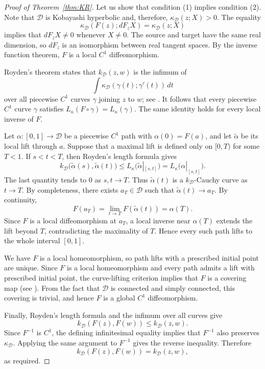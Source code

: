 \documentclass[10pt,a4paper]{amsart}
\newcommand{\D}{\mathcal D}
\newcommand{\kD}{k_{\D}}
\newcommand{\kapD}{\kappa_{\D}}
\begin{document}
\begin{proof}[Proof of Theorem~\ref{thm:KR}]
Let us show that condition {\rm (1)} implies condition
{\rm (2)}. Note that $\D$ is Kobayashi hyperbolic and, therefore,
$\kapD(z;X)>0$. The equality
\[
\kapD(F(z);dF_zX)=\kapD(z;X)
\]
implies that $dF_zX\neq0$ whenever $X\neq0$. The source and target have the same real dimension, so $dF_z$ is an
isomorphism between real tangent spaces. By the inverse
function theorem, $F$ is a local $C^1$ diffeomorphism.

Royden's theorem states that $\kD(z,w)$ is the infimum of
\[
\int \kapD(\gamma(t);\gamma'(t))\,dt
\]
over all piecewise $C^1$ curves $\gamma$ joining $z$ to $w$; see
\cite{Royden,JP}. It follows that every piecewise $C^1$ curve $\gamma$
satisfies $L_\kappa(F\circ\gamma)=L_\kappa(\gamma)$.
The same identity holds for every local inverse of $F$.

Let
$\alpha:[0,1]\to\D$ be a piecewise $C^1$ path with
$\alpha(0)=F(a)$, and let $\widetilde\alpha$ be its local lift through $a$. Suppose that a maximal lift is defined only on $[0,T)$ for some
$T<1$. If $s<t<T$, then Royden's length formula gives
\[
\kD\bigl(\widetilde\alpha(s),\widetilde\alpha(t)\bigr)
\leq
L_\kappa\bigl(\widetilde\alpha|_{[s,t]}\bigr)
=
L_\kappa\bigl(\alpha|_{[s,t]}\bigr).
\]
The last quantity tends to $0$ as $s,t\to T$. Thus
$\widetilde\alpha(t)$ is a $\kD$-Cauchy curve as $t\to T$.
By completeness, there exists $a_T\in\D$ such that
$\widetilde\alpha(t)\to a_T$. By continuity,
\[
F(a_T)
=
\lim_{t\to T}F(\widetilde\alpha(t))
=
\alpha(T).
\]
Since $F$ is a local diffeomorphism at $a_T$, a local inverse near
$\alpha(T)$ extends the lift beyond $T$, contradicting the maximality
of $T$. Hence every such path lifts to the whole interval $[0,1]$.

We have $F$ is a local homeomorphism, so path lifts with a prescribed initial point are unique.  Since $F$ is a local homeomorphism and every path admits a lift with prescribed initial point, the curve-lifting criterion implies that $F$ is a covering map (see 
\cite[Theorem 4.19]{Forster}).
From the fact that $\D$ is connected and simply connected, this covering is trivial, and hence $F$ is a global $C^1$ diffeomorphism.

Finally, Royden's length formula and the infimum over all curves give
\[
\kD(F(z),F(w))\leq\kD(z,w).
\]
Since $F^{-1}$ is $C^1$, the defining infinitesimal equality implies
that $F^{-1}$ also preserves $\kapD$. Applying the same argument to
$F^{-1}$ gives the reverse inequality. Therefore
\[
\kD(F(z),F(w))=\kD(z,w),
\]
as required.


\end{proof}
\end{document}
